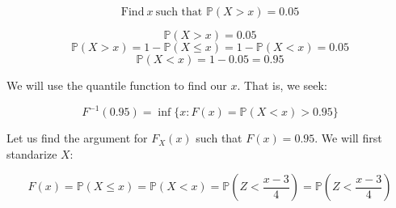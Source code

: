 \documentclass{article}
\begin{document}
\begin{equation*}
    \mbox{Find}  \ x  \ \mbox{such that } \mathds{P}(X > x) = 0.05
\end{equation*}

\begin{equation*}
    \mathds{P}(X > x) = 0.05
\end{equation*}
\begin{equation*}
    \mathds{P}(X > x) = 1 - \mathds{P}(X \leq x) = 1 - \mathds{P}(X < x) = 0.05
\end{equation*}
\begin{equation*}
    \mathds{P}(X < x) = 1 - 0.05 = 0.95
\end{equation*}

We will use the quantile function to find our \(x\). That is, we seek:

\begin{equation*}
    F^{-1}(0.95) = \inf \{x : F(x) = \mathds{P}(X < x) > 0.95\}
\end{equation*}

Let us find the argument for \(F_{X}(x)\) such that \(F(x) = 0.95\). We will first standarize \(X\):

\begin{equation*}
    F(x) = \mathds{P}(X \leq x) =  \mathds{P}(X < x) = \mathds{P}(Z < \frac{x - 3}{4}) = \mathds{P}(Z < \frac{x - 3}{4})
\end{equation*}
\end{document}
